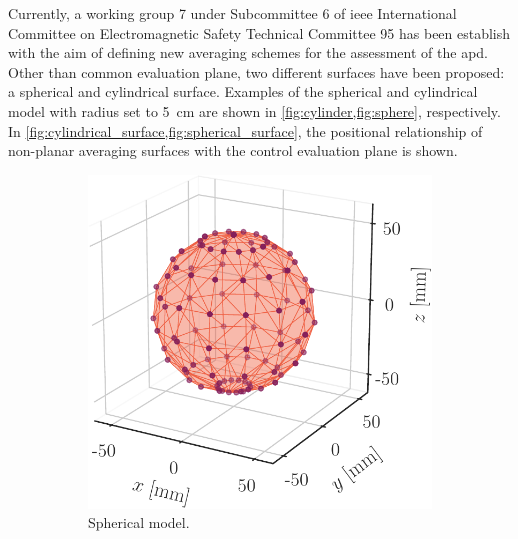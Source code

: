 Currently, a working group 7 under Subcommittee 6 of \gls{ieee} International Committee on Electromagnetic Safety Technical Committee 95 has been establish with the aim of defining new averaging schemes for the assessment of the \gls{apd}.
Other than common evaluation plane, two different surfaces have been proposed: a spherical and cylindrical surface.
Examples of the spherical and cylindrical model with radius set to \SI{5}{\cm} are shown in \cref{fig:cylinder,fig:sphere}, respectively.
In \cref{fig:cylindrical_surface,fig:spherical_surface}, the positional relationship of non-planar averaging surfaces with the control evaluation plane is shown.
\begin{figure}[ht]
    \centering
    \begin{subfigure}[b]{0.42\textwidth}
        \centering
        \includegraphics[width=\linewidth]{artwork/spherical_model.pdf}
        \caption{Spherical model.}
        \label{fig:spherical_model}
    \end{subfigure}
    \hfil
    \begin{subfigure}[b]{0.47\textwidth}
        \centering

\end{subfigure}
\end{figure}
